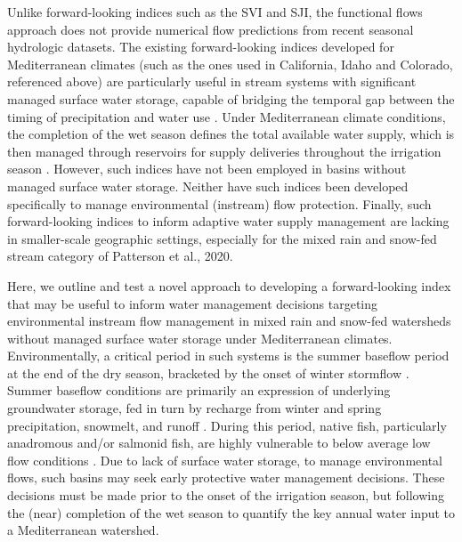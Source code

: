 \documentclass[hess, manuscript]{copernicus}
\begin{document}
Unlike forward-looking indices such as the SVI and SJI, the functional
flows approach \citep[e.g.][]{Yarnell2020} does not provide numerical
flow predictions from recent seasonal hydrologic datasets. The existing
forward-looking indices developed for Mediterranean climates (such as
the ones used in California, Idaho and Colorado, referenced above) are
particularly useful in stream systems with significant managed surface
water storage, capable of bridging the temporal gap between the timing
of precipitation and water use \citeyearpar[e.g., DWR][]{DWR2023}. Under
Mediterranean climate conditions, the completion of the wet season
defines the total available water supply, which is then managed through
reservoirs for supply deliveries throughout the irrigation season
\citeyearpar[e.g., CDWR][]{ColoradoDWR2023}. However, such indices have
not been employed in basins without managed surface water storage.
Neither have such indices been developed specifically to manage
environmental (instream) flow protection. Finally, such forward-looking
indices to inform adaptive water supply management are lacking in
smaller-scale geographic settings, especially for the mixed rain and
snow-fed stream category of Patterson et al., 2020.

Here, we outline and test a novel approach to developing a
forward-looking index that may be useful to inform water management
decisions targeting environmental instream flow management in mixed rain
and snow-fed watersheds without managed surface water storage under
Mediterranean climates. Environmentally, a critical period in such
systems is the summer baseflow period at the end of the dry season,
bracketed by the onset of winter stormflow \citep{Peek2022}. Summer
baseflow conditions are primarily an expression of underlying
groundwater storage, fed in turn by recharge from winter and spring
precipitation, snowmelt, and runoff \citep{Tarboton2003}. During this
period, native fish, particularly anadromous and/or salmonid fish, are
highly vulnerable to below average low flow conditions
\citep[e.g.,][]{VanKirk2008a}. Due to lack of surface water storage, to
manage environmental flows, such basins may seek early protective water
management decisions. These decisions must be made prior to the onset of
the irrigation season, but following the (near) completion of the wet
season to quantify the key annual water input to a Mediterranean
watershed.
\end{document}

